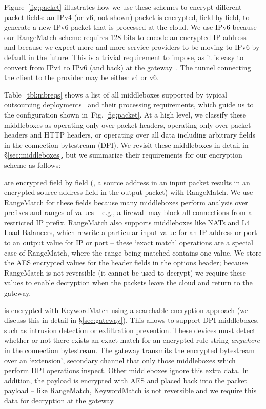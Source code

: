 Figure~\ref{fig:packet} illustrates how we use these schemes to encrypt different packet fields: an IPv4 (or v6, not shown) packet is encrypted, field-by-field, to generate a new IPv6 packet that is processed at the cloud.
We use IPv6 because our RangeMatch scheme requires 128 bits to encode an encrypted IP address -- and because we expect more and more service providers to be moving to IPv6 by default in the future.
This is a trivial requirement to impose, as it is easy to convert from IPv4 to IPv6 (and back) at the gateway~\cite{6to4,4to6}.
The tunnel connecting the client to the provider may be either v4 or v6.

Table~\ref{tbl:mbreqs} shows a list of all middleboxes supported by typical outsourcing deployments~\cite{aplomb} and their processing requirements, which guide us to the configuration shown in~Fig. \ref{fig:packet}.
At a high level, we classify these middleboxes as operating only over packet headers, operating only over packet headers and HTTP headers, or operating over all data including arbitrary fields in the connection bytestream (DPI).
We revisit these middleboxes in detail in \S\ref{sec:middleboxes}, but we summarize their requirements for our encryption scheme as follows:

 are encrypted field by field (\eg{}, a source address in an input packet results in an encrypted source address field in the output packet) with RangeMatch.
We use RangeMatch for these fields because many middleboxes perform analysis over prefixes and ranges of values -- e.g., a firewall may block all connections from a restricted IP prefix.
RangeMatch also supports middleboxes like NATs and L4 Load Balancers, which rewrite a particular input value for an IP address or port to an output value for IP or port -- these `exact match' operations are a special case of RangeMatch, where the range being matched contains one value.
We store the AES encrypted values for the header fields in the options header; because RangeMatch is not reversible (it cannot be used to decrypt) we require these values to enable decryption when the packets leave the cloud and return to the gateway.

 is encrypted with KeywordMatch using a searchable encryption approach (we discuss this in detail in \S\ref{sec:gateway}). This allows \sys to support DPI middleboxes, such as intrusion detection or exfiltration prevention.
These devices must detect whether or not there exists an exact match for an encrypted rule string {\it anywhere} in the connection bytestream.
The gateway transmits the encrypted bytestream over an `extension', secondary channel that only those middleboxes which perform DPI operations inspect. 
Other middleboxes ignore this extra data.
In addition, the payload is encrypted with AES and placed back into the packet payload -- like RangeMatch, KeywordMatch is not reversible and we require this data for decryption at the gateway.

